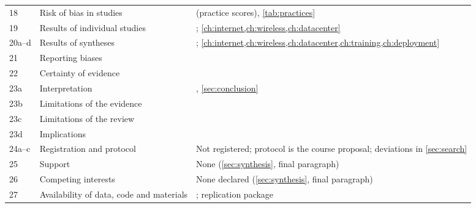 \begin{small}
\begin{longtable}{@{}lL{5.2cm}L{8.3cm}@{}}
18 & Risk of bias in studies &  (practice scores), \cref{tab:practices} \\
19 & Results of individual studies & ; \cref{ch:internet,ch:wireless,ch:datacenter} \\
20a--d & Results of syntheses & ; \cref{ch:internet,ch:wireless,ch:datacenter,ch:training,ch:deployment} \\
21 & Reporting biases &  \\
22 & Certainty of evidence &  \\
23a & Interpretation & , \cref{sec:conclusion} \\
23b & Limitations of the evidence &  \\
23c & Limitations of the review &  \\
23d & Implications &  \\
24a--c & Registration and protocol & Not registered; protocol is the course proposal; deviations in \cref{sec:search} \\
25 & Support & None (\cref{sec:synthesis}, final paragraph) \\
26 & Competing interests & None declared (\cref{sec:synthesis}, final paragraph) \\
27 & Availability of data, code and materials & ; replication package \\
\end{longtable}
\end{small}
